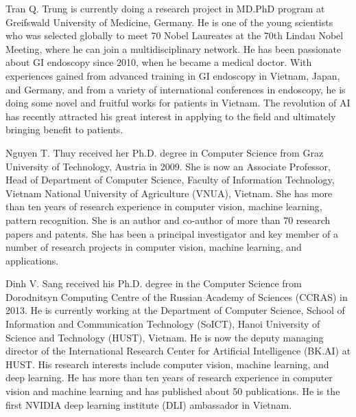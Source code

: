 \documentclass{ieeeaccess}
\begin{document}
\begin{IEEEbiography}{Tran Q. Trung} is currently doing a research project in MD.PhD program at Greifswald University of Medicine, Germany. He is one of the young scientists who was selected globally to meet 70 Nobel Laureates at the 70th Lindau Nobel Meeting, where he can join a multidisciplinary network. He has been passionate about GI endoscopy since 2010, when he became a medical doctor. With experiences gained from advanced training in GI endoscopy in Vietnam, Japan, and Germany, and from a variety of international conferences in endoscopy, he is doing some novel and fruitful works for patients in Vietnam. The revolution of AI has recently attracted his great interest in applying to the field and ultimately bringing benefit to patients.
\end{IEEEbiography}

\begin{IEEEbiography}{Nguyen T. Thuy} received her Ph.D. degree in Computer Science from Graz University of Technology, Austria in 2009. She is now an Associate Professor, Head of Department of Computer Science, Faculty of Information Technology, Vietnam National University of Agriculture (VNUA), Vietnam. She has more than ten years of research experience in computer vision, machine learning, pattern recognition. She is an author and co-author of more than 70 research papers and patents. She has been a principal investigator and key member of a number of research projects in computer vision, machine learning, and applications.
\end{IEEEbiography}

\begin{IEEEbiography}{Dinh V. Sang} received his Ph.D. degree in the Computer Science from Dorodnitsyn Computing Centre of the Russian Academy of Sciences (CCRAS) in 2013. He is currently working at the Department of Computer Science, School of Information and Communication Technology (SoICT), Hanoi University of Science and Technology (HUST), Vietnam. He is now the deputy managing director of the International Research Center for Artificial Intelligence (BK.AI) at HUST. His research interests include computer vision, machine learning, and deep learning. He has more than ten years of research experience in computer vision and machine learning and has published about 50 publications. He is the first NVIDIA deep learning institute (DLI) ambassador in Vietnam.
\end{IEEEbiography}

\EOD
\end{document}
